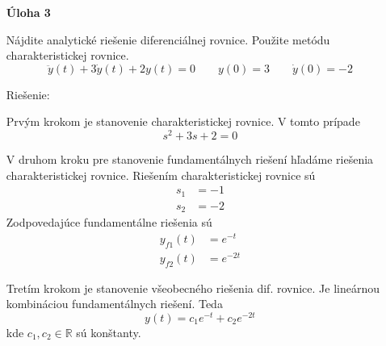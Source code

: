 \documentclass[a4paper, 10pt, ]{article}
\begin{document}
\begin{itemize}[leftmargin=0pt, labelsep=3mm, itemsep=0pt]
    \item[\textsf{\bfseries Úloha 3}] {\sffamily%
    Nájdite analytické riešenie diferenciálnej rovnice. Použite metódu charakteristickej rovnice.
	\begin{equation*} 
        \ddot y(t) + 3\dot y(t) + 2 y(t) = 0 \qquad y(0)=3 \qquad \dot y(0) = -2
    \end{equation*}
    
    Riešenie:}

    Prvým krokom je stanovenie charakteristickej rovnice. V tomto prípade
    \begin{equation}
        s^2 + 3s + 2 = 0
    \end{equation}

    V druhom kroku pre stanovenie fundamentálnych riešení hľadáme riešenia charakteristickej rovnice. Riešením charakteristickej rovnice sú
    \begin{subequations}
        \begin{align}
            s_1 &= -1 \\
            s_2 &= -2
        \end{align}
    \end{subequations}
    Zodpovedajúce fundamentálne riešenia sú
    \begin{subequations}
        \begin{align}
            y_{f1}(t) &= e^{-t} \\
            y_{f2}(t) &= e^{-2t}
        \end{align}
    \end{subequations}

    Tretím krokom je stanovenie všeobecného riešenia dif. rovnice. Je lineárnou kombináciou fundamentálnych riešení. Teda
    \begin{equation}
        y(t) = c_1 e^{-t} + c_2 e^{-2t}
    \end{equation}
    kde $c_1, c_2 \in \mathbb{R}$ sú konštanty.


\end{itemize}
\end{document}

